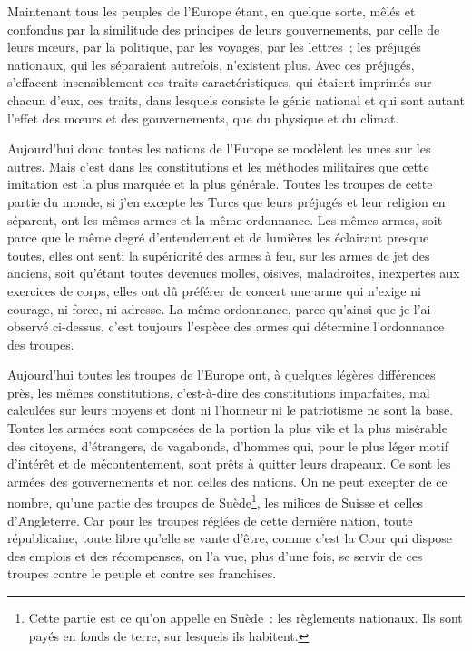 \documentclass[french,twoside]{book} %
\begin{document}
Maintenant tous les peuples de l’Europe étant, en quelque sorte, mêlés et confondus par la similitude des principes de leurs gouvernements, par celle de leurs mœurs, par la politique, par les voyages, par les lettres ; les préjugés nationaux, qui les séparaient autrefois, n’existent plus. Avec ces préjugés, s’effacent insensiblement ces traits caractéristiques, qui étaient imprimés sur chacun d’eux, ces traits, dans lesquels consiste le génie national et qui sont autant l’effet des mœurs et des gouvernements, que du physique et du climat.\par
Aujourd’hui donc toutes les nations de l’Europe se modèlent les unes sur les autres. Mais c’est dans les constitutions et les méthodes militaires que cette imitation est la plus marquée et la plus générale. Toutes les troupes de cette partie du monde, si j’en excepte les Turcs que leurs préjugés et leur religion en séparent, ont les mêmes armes et la même ordonnance. Les mêmes armes, soit parce que le même degré d’entendement et de lumières les éclairant presque toutes, elles ont senti la supériorité des armes à feu, sur les armes de jet des anciens, soit qu’étant toutes devenues molles, oisives, maladroites, inexpertes aux exercices de corps, elles ont dû préférer de concert une arme qui n’exige ni courage, ni force, ni adresse. La même ordonnance, parce qu’ainsi que je l’ai observé ci-dessus, c’est toujours l’espèce des armes qui détermine l’ordonnance des troupes.\par
Aujourd’hui toutes les troupes de l’Europe ont, à quelques légères différences près, les mêmes constitutions, c’est-à-dire des constitutions imparfaites, mal calculées sur leurs moyens et dont ni l’honneur ni le patriotisme ne sont la base. Toutes les armées sont composées de la portion la plus vile et la plus misérable des citoyens, d’étrangers, de vagabonds, d’hommes qui, pour le plus léger motif d’intérêt et de mécontentement, sont prêts à quitter leurs drapeaux. Ce sont les armées des gouvernements et non celles des nations. On ne peut excepter de ce nombre, qu’une partie des troupes de Suède\footnote{Cette partie est ce qu’on appelle en Suède : les règlements nationaux. Ils sont payés en fonds de terre, sur lesquels ils habitent.}, les milices de Suisse et celles d’Angleterre. Car pour les troupes réglées de cette dernière nation, toute républicaine, toute libre qu’elle se vante d’être, comme c’est la Cour qui dispose des emplois et des récompenses, on l’a vue, plus d’une fois, se servir de ces troupes contre le peuple et contre ses franchises.\par
\end{document}
